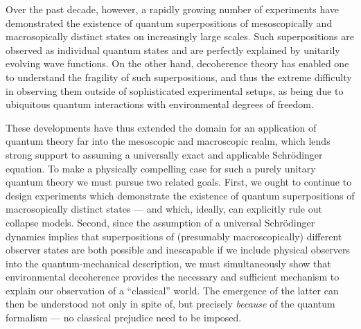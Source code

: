 \documentclass[twocolumn,aps,floatfix,amsmath,amssymb,showpacs,nofootinbib]{revtex4}
\begin{document}
Over the past decade, however, a rapidly growing number of experiments
have demonstrated the existence of quantum superpositions of
mesoscopically and macrosopically distinct states on increasingly
large scales. Such superpositions are observed as individual quantum
states and are perfectly explained by unitarily evolving wave
functions.  On the other hand, decoherence theory
\cite{Zeh:1970:yt,Zeh:1973:wq,Zurek:1981:dd,Zurek:2002:ii,Joos:2003:jh,Schlosshauer:2003:tv}
has enabled one to understand the fragility of such superpositions,
and thus the extreme difficulty in observing them outside of
sophisticated experimental setups, as being due to ubiquitous quantum
interactions with environmental degrees of freedom.

These developments have thus extended the domain for an application of
quantum theory far into the mesoscopic and macroscopic realm, which
lends strong support to assuming a universally exact and applicable
Schr\"odinger equation. To make a physically compelling case for such
a purely unitary quantum theory we must pursue two related goals.
First, we ought to continue to design experiments which demonstrate
the existence of quantum superpositions of macrosopically distinct
states --- and which, ideally, can explicitly rule out collapse
models. Second, since the assumption of a universal Schr\"odinger
dynamics implies that superpositions of (presumably macroscopically)
different observer states are both possible and inescapable if we
include physical observers into the quantum-mechanical description, we
must simultaneously show that environmental decoherence provides the
necessary and sufficient mechanism to explain our observation of a
``classical'' world. The emergence of the latter can then be
understood not only in spite of, but precisely {\em because} of the
quantum formalism --- no classical prejudice need to be imposed.
\end{document}
